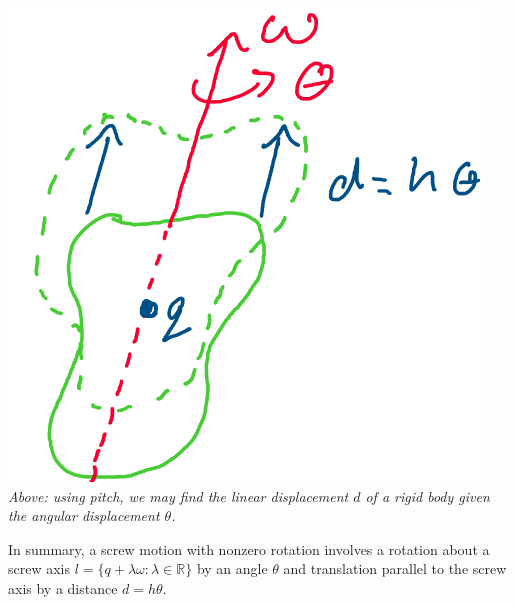 \documentclass[oneside]{book}
\begin{document}
\begin{center}
    \includegraphics[scale=0.3]{images/pitch.png}\\
    \textit{Above: using pitch, we may find the linear displacement $d$ of a rigid body given the angular displacement $\theta$.}
\end{center}
In summary, a screw motion with nonzero rotation involves a rotation about a screw axis $l = \{q + \lambda \omega: \lambda \in \mathbb{R}\}$ by an angle $\theta$ and translation parallel to the screw axis by a distance $d = h\theta$.
\end{document}
